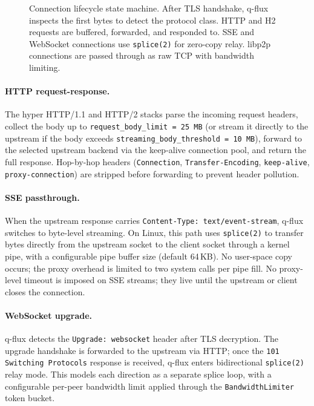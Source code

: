 \documentclass[a4paper, 11pt]{article}
\begin{document}
\begin{figure}[t]
\caption{Connection lifecycle state machine. After TLS handshake, q-flux
inspects the first bytes to detect the protocol class. HTTP and H2 requests are
buffered, forwarded, and responded to. SSE and WebSocket connections use
\texttt{splice(2)} for zero-copy relay. libp2p connections are passed through as
raw TCP with bandwidth limiting.}
\label{fig:conn-lifecycle}
\end{figure}

\paragraph{HTTP request-response.}  The hyper HTTP/1.1 and HTTP/2 stacks parse
the incoming request headers, collect the body up to
\texttt{request\_body\_limit~=~25\,MB} (or stream it directly to the upstream if
the body exceeds \texttt{streaming\_body\_threshold~=~10\,MB}), forward to the
selected upstream backend via the keep-alive connection pool, and return the full
response.  Hop-by-hop headers (\texttt{Connection}, \texttt{Transfer-Encoding},
\texttt{keep-alive}, \texttt{proxy-connection}) are stripped before forwarding to
prevent header pollution.

\paragraph{SSE passthrough.}  When the upstream response carries
\texttt{Content-Type: text/event-stream}, q-flux switches to byte-level
streaming.  On Linux, this path uses \texttt{splice(2)} to transfer bytes
directly from the upstream socket to the client socket through a kernel pipe,
with a configurable pipe buffer size (default 64\,KB).  No user-space copy
occurs; the proxy overhead is limited to two system calls per pipe fill.  No
proxy-level timeout is imposed on SSE streams; they live until the upstream or
client closes the connection.

\paragraph{WebSocket upgrade.}  q-flux detects the \texttt{Upgrade: websocket}
header after TLS decryption.  The upgrade handshake is forwarded to the upstream
via HTTP; once the \texttt{101 Switching Protocols} response is received,
q-flux enters bidirectional \texttt{splice(2)} relay mode.  This models each
direction as a separate splice loop, with a configurable per-peer bandwidth limit
applied through the \texttt{BandwidthLimiter} token bucket.
\end{document}
